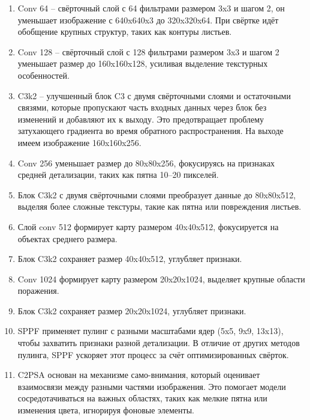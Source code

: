 \begin{enumerate}
	\item Conv 64 -- свёрточный слой с 64 фильтрами размером 3x3 и шагом 2, он уменьшает изображение с 640x640x3 до 320x320x64. При свёртке идёт обобщение крупных структур, таких как контуры листьев.
	
	\item Conv 128 -- свёрточный слой с 128 фильтрами размером 3x3 и шагом 2 уменьшает размер до 160x160x128, усиливая выделение текстурных особенностей.
	
	\item C3k2 -- улучшенный блок C3 с двумя свёрточными слоями и остаточными связями, которые пропускают часть входных данных через блок без изменений и добавляют их к выходу. Это предотвращает проблему затухающего градиента во время обратного распространения. На выходе имеем изображение 160x160x256.
	
	\item Conv 256 уменьшает размер до 80x80x256, фокусируясь на признаках средней детализации, таких как пятна 10–20 пикселей.
	
	\item Блок C3k2 с двумя свёрточными слоями преобразует данные до 80x80x512, выделяя более сложные текстуры, такие как пятна или повреждения листьев.
	
	\item Слой conv 512 формирует карту размером 40x40x512, фокусируется на объектах среднего размера.
	
	\item Блок C3k2 сохраняет размер 40x40x512, углубляет признаки.
	
	\item Conv 1024 формирует карту размером 20x20x1024, выделяет крупные области поражения.
	
	\item Блок C3k2 сохраняет размер 20x20x1024, углубляет признаки.
	
	\item SPPF применяет пулинг с разными масштабами ядер (5x5, 9x9, 13x13), чтобы захватить признаки разной детализации. В отличие от других методов пулинга, SPPF ускоряет этот процесс за счёт оптимизированных свёрток.
	 
	\item C2PSA основан на механизме само-внимания, который оценивает взаимосвязи между разными частями изображения. Это помогает модели сосредотачиваться на важных областях, таких как мелкие пятна или изменения цвета, игнорируя фоновые элементы.
	
\end{enumerate}

